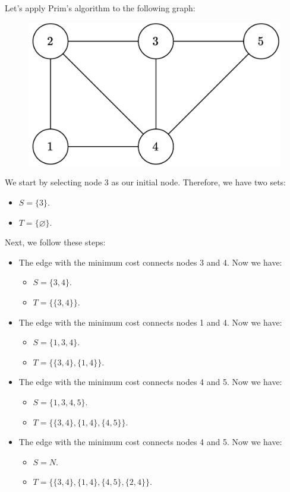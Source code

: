 \begin{example}
    Let's apply Prim's algorithm to the following graph:
    \begin{figure}[H]
        \centering
        \includegraphics[width=0.3\linewidth]{images/sgraph.png}
    \end{figure}
    We start by selecting node 3 as our initial node. 
    Therefore, we have two sets: 
    \begin{itemize}
        \item $S=\{3\}$.
        \item $T=\{\varnothing\}$.
    \end{itemize}
    Next, we follow these steps:
    \begin{itemize}
        \item The edge with the minimum cost connects nodes 3 and 4. 
            Now we have: 
            \begin{itemize}
                \item $S=\{3,4\}$.
                \item $T=\{\{3,4\}\}$.
            \end{itemize}
        \item The edge with the minimum cost connects nodes 1 and 4. 
            Now we have:
            \begin{itemize}
                \item $S=\{1,3,4\}$. 
                \item $T=\{\{3,4\},\{1,4\}\}$.
            \end{itemize}
        \item The edge with the minimum cost connects nodes 4 and 5. 
        Now we have: 
        \begin{itemize}
            \item $S=\{1,3,4,5\}$.
            \item $T=\{\{3,4\},\{1,4\},\{4,5\}\}$.
        \end{itemize}
        \item The edge with the minimum cost connects nodes 4 and 5. 
        Now we have:
        \begin{itemize}
            \item $S=N$.
            \item $T=\{\{3,4\},\{1,4\},\{4,5\},\{2,4\}\}$.

\end{itemize}
\end{itemize}
\end{example}
